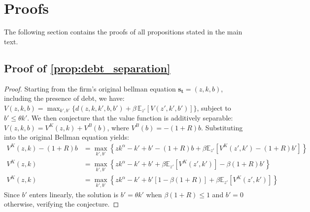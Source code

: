 \section{Proofs}

The following section contains the proofs of all propositions stated in the main text.

\subsection{Proof of \ref{prop:debt_separation}} \label{app:proof:debt_separation}
\begin{proof}
Starting from the firm's original bellman equation $\mathbf{s_t} = (z, k, b)$, including the presence
of debt, we have:
$V(z, k, b) = \max_{k', b'} \{d(z, k, k', b, b') + \beta\, \mathbb{E}_{z'}[V(z', k', b')]\}$, 
subject to $b' \leq \theta k'$. We then conjecture that the value function is additively 
separable: $V(z, k, b) = V^K(z, k) + V^B(b)$, where $V^B(b) = -(1+R)b$. 
Substituting into the original Bellman equation yields:
\begin{align}
V^K(z, k) - (1+R)b &= \max_{k', b'} \left\{ z k^\alpha - k' + b' - (1+R)b 
+ \beta \mathbb{E}_{z'}\left[V^K(z', k') - (1+R)b'\right] \right\} \\
V^K(z, k) &= \max_{k', b'} \left\{ z k^\alpha - k' + b'
+ \beta \mathbb{E}_{z'}\left[V^K(z', k')\right] - \beta(1+R)b' \right\} \\
V^K(z, k) &= \max_{k', b'} \left\{ z k^\alpha - k' + b'[1 - \beta(1+R)] 
+ \beta \mathbb{E}_{z'}\left[V^K(z', k')\right] \right\}
\end{align}
Since $b'$ enters linearly, the solution is $b' = \theta k'$ when 
$\beta(1+R) \leq 1$ and $b' = 0$ otherwise, verifying the conjecture.
\end{proof}

